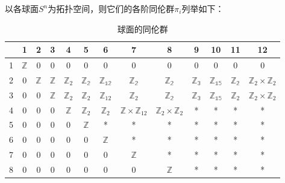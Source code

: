 

以各球面$S^n$为拓扑空间，则它们的各阶同伦群$\pi_i$列举如下：

\begin{table}[ht]
\centering
\caption{球面的同伦群}\label{SphHmt_tab1}
\begin{tabular}{|c|c|c|c|c|c|c|c|c|c|c|c|c|}
\hline
 & 1 & 2 & 3 & 4 & 5 & 6 & 7 & 8 & 9 & 10 & 11 & 12 \\
\hline
1 & $\mathbb{Z}$ & 0 & 0 & 0 & 0 & 0 & 0 & 0 & 0 & 0 & 0 & 0 \\
\hline
2 & 0 & $\mathbb{Z}$ & $\mathbb{Z}$ & $\mathbb{Z}_2$ & $\mathbb{Z_2}$ & $\mathbb{Z_{12}}$ & $\mathbb{Z_2}$ & $\mathbb{Z_2}$ & $\mathbb{Z_3}$ & $\mathbb{Z_{15}}$ & $\mathbb{Z_2}$ & $\mathbb{Z}_2\times\mathbb{Z}_2$\\
\hline
3 & 0 & 0 & $\mathbb{Z}$ & $\mathbb{Z}_2$ & $\mathbb{Z}_2$ & $\mathbb{Z}_{12}$ & $\mathbb{Z}_2$ & $\mathbb{Z_2}$ & $\mathbb{Z_3}$ & $\mathbb{Z_{15}}$ & $\mathbb{Z}_2$ & $\mathbb{Z}_2\times\mathbb{Z}_2$ \\
\hline
4 & 0 & 0 & 0 & $\mathbb{Z}$ & $\mathbb{Z}_2$ & $\mathbb{Z}_2$ & $\mathbb{Z}\times\mathbb{Z}_{12}$ & $\mathbb{Z}_2\times\mathbb{Z}_2$ & * & * & * & * \\
\hline
5 & 0 & 0 & 0 & 0 & $\mathbb{Z}$ & * & * & * & * & * & * & * \\
\hline
6 & 0 & 0 & 0 & 0 & 0 & $\mathbb{Z}$ & * & * & * & * & * & * \\
\hline
7 & 0 & 0 & 0 & 0 & 0 & 0 & $\mathbb{Z}$ & * & * & * & * & * \\
\hline
8 & 0 & 0 & 0 & 0 & 0 & 0 & 0 & $\mathbb{Z}$ & * & * & * & * \\
\hline
\end{tabular}
\end{table}